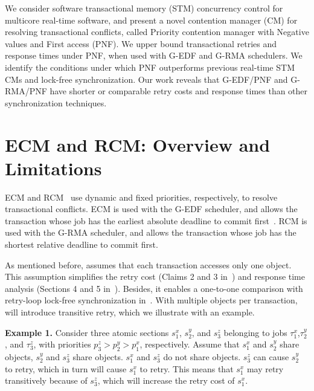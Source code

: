 We consider software transactional memory (STM) concurrency control for multicore real-time software, and present a novel contention manager (CM) for resolving transactional conflicts, called Priority contention manager with Negative values and First access (PNF). We upper bound transactional retries and response times under PNF, when used with G-EDF and  G-RMA schedulers. We identify the conditions under which PNF outperforms previous real-time STM CMs and lock-free synchronization. Our work reveals that G-EDF/PNF and G-RMA/PNF have shorter or comparable retry costs and response times than other synchronization techniques.

\section{ECM and RCM: Overview and Limitations\label{probelm description}}

ECM and RCM~\cite{stmconcurrencycontrol:emsoft11} use dynamic and fixed priorities, respectively, to resolve transactional conflicts. ECM is used with the G-EDF scheduler, and allows the transaction whose job has the earliest absolute deadline to commit first~\cite{6045438}. RCM is used with the G-RMA scheduler, and allows the transaction whose job has the shortest relative deadline to commit first.


As mentioned before, \cite{stmconcurrencycontrol:emsoft11} assumes that each transaction accesses only one object. This assumption simplifies the retry cost (Claims 2 and 3 in~\cite{stmconcurrencycontrol:emsoft11}) and response time analysis (Sections 4 and 5 in~\cite{stmconcurrencycontrol:emsoft11}). Besides, it enables a one-to-one comparison with retry-loop lock-free synchronization in~\cite{key-5}. With multiple objects per transaction, \cite{stmconcurrencycontrol:emsoft11} will introduce transitive retry, which we illustrate with an example.


\textbf{Example 1.} Consider three atomic sections $s_{1}^{x}$, $s_{2}^{y}$, 
and $s_{3}^{z}$ belonging to jobs $\tau_{1}^{x}$,$\tau_{2}^{y}$, 
and $\tau_{3}^{z}$, with priorities $p_{3}^{z}>p_{2}^{y}>p_{1}^{x}$, respectively. 
Assume that $s_{1}^{x}$ and $s_{2}^{y}$ share objects, $s_{2}^{y}$ and $s_{3}^{z}$
share objects. $s_{1}^{x}$ and $s_{3}^{z}$ do not share objects.
$s_{3}^{z}$ can cause $s_{2}^{y}$ to retry, which in turn will cause $s_{1}^{x}$ to retry. 
This means that $s_{1}^{x}$ may retry transitively
because of $s_{3}^{z}$, which will increase the retry cost of $s_{1}^{x}$.

